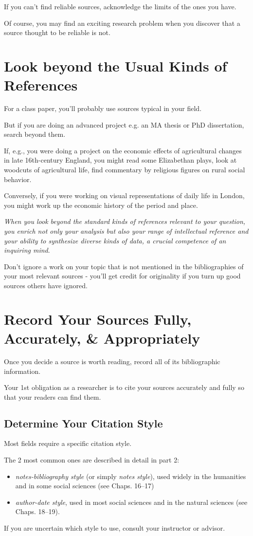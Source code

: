 \documentclass[oneside]{book}
\numberwithin{equation}{section}
\begin{document}
If you can't find reliable sources, acknowledge the limits of the ones you have.

Of course, you may find an exciting research problem when you discover that a source thought to be reliable is not.

\section{Look beyond the Usual Kinds of References}
For a class paper, you'll probably use sources typical in your field.

But if you are doing an advanced project e.g. an MA thesis or PhD dissertation, search beyond them.

If, e.g., you were doing a project on the economic effects of agricultural changes in late 16th-century England, you might read some Elizabethan plays, look at woodcuts of agricultural life, find commentary by religious figures on rural social behavior.

Conversely, if you were working on visual representations of daily life in London, you might work up the economic history of the period and place.

\textit{When you look beyond the standard kinds of references relevant to your question, you enrich not only your analysis but also your range of intellectual reference and your ability to synthesize diverse kinds of data, a crucial competence of an inquiring mind}.

Don't ignore a work on your topic that is not mentioned in the bibliographies of your most relevant sources - you'll get credit for originality if you turn up good sources others have ignored.

\section{Record Your Sources Fully, Accurately, \& Appropriately}
Once you decide a source is worth reading, record all of its bibliographic information.

Your 1st obligation as a researcher is to cite your sources accurately and fully so that your readers can find them.

\subsection{Determine Your Citation Style}
Most fields require a specific citation style.

The 2 most common ones are described in detail in part 2:
\begin{itemize}
    \item \textit{notes-bibliography style} (or simply \textit{notes style}), used widely in the humanities and in some social sciences (see Chaps. 16--17)
    \item \textit{author-date style}, used in most social sciences and in the natural sciences (see Chaps. 18--19).
\end{itemize}
If you are uncertain which style to use, consult your instructor or advisor.
\end{document}
